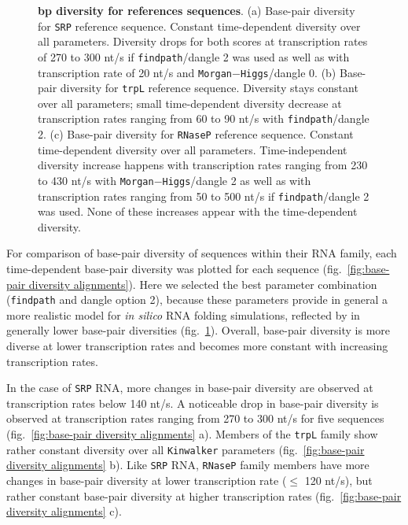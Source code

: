 \documentclass[ twoside,openright,titlepage,numbers=noenddot,headinclude,%
                footinclude=false, cleardoublepage=empty,abstractoff, %
                BCOR=5mm,paper=a4,fontsize=11pt,%
                ngerman,american,%
                ]{scrreprt}
\begin{document}
\begin{figure}[ht]
\begin{tabular}{c|c}
\end{tabular}
\caption{{\bf bp diversity for references sequences}. 
(a) Base-pair diversity for \texttt{SRP} reference sequence. Constant time-dependent diversity over all parameters. Diversity drops for both scores at transcription rates of 270 to 300 nt/s if \texttt{findpath}/dangle 2 was used as well as with transcription rate of 20 nt/s and \texttt{Morgan$-$Higgs}/dangle $0$. 
(b) Base-pair diversity for \texttt{trpL} reference sequence. Diversity stays constant over all parameters; small time-dependent diversity decrease at transcription rates ranging from 60 to 90 nt/s with \texttt{findpath}/dangle 2.
(c) Base-pair diversity for \texttt{RNaseP} reference sequence. Constant time-dependent diversity over all parameters. Time-independent diversity increase happens with transcription rates ranging from 230 to 430 nt/s with \texttt{Morgan$-$Higgs}/dangle 2 as well as with transcription rates ranging from 50 to 500 nt/s if \texttt{findpath}/dangle 2 was used. None of these increases appear with the time-dependent diversity.
}
\label{fig:base-pair diversity}
\end{figure}
		
For comparison of base-pair diversity of sequences within their RNA family,
each time-dependent base-pair diversity was plotted for each sequence
(fig.~\ref{fig:base-pair diversity alignments}).
Here we selected the best parameter combination (\texttt{findpath} and
dangle option 2), because these parameters provide in general a more
realistic model for \textit{in silico} RNA folding simulations, reflected
by in generally lower base-pair diversities (fig.~\ref{fig:base-pair diversity}).
Overall, base-pair diversity is more diverse at lower transcription rates and becomes more constant with increasing transcription rates. 	

In the case of \texttt{SRP} RNA, 
more changes in base-pair diversity are observed at transcription rates below 140
nt/s. A noticeable drop in base-pair diversity is observed at transcription rates ranging from 270 to
300 nt/s for five sequences (fig.~\ref{fig:base-pair diversity alignments} a).
Members of the \texttt{trpL} family show rather constant diversity over all \texttt{Kinwalker} parameters (fig.~\ref{fig:base-pair diversity alignments} b).
Like \texttt{SRP} RNA, \texttt{RNaseP} family members have 
more changes in base-pair diversity at lower transcription rate ($\le$ 120 nt/s), but rather constant base-pair diversity at higher transcription rates (fig.~\ref{fig:base-pair diversity alignments} c).
\end{document}
